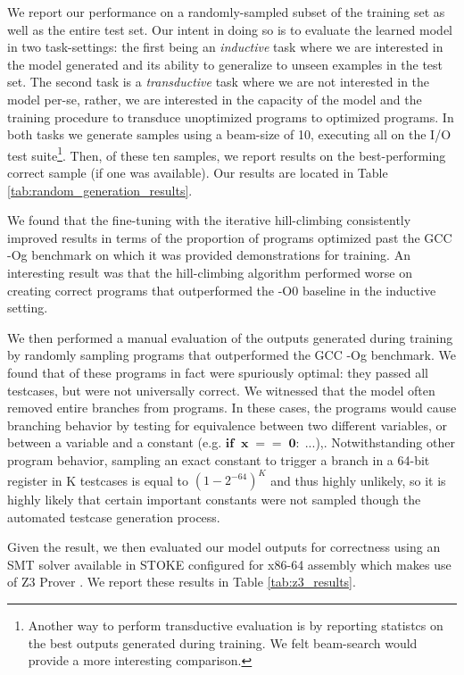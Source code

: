 \documentclass{article}
\begin{document}
We report our performance on a randomly-sampled subset of the training set as well as the entire test set. Our intent in doing so is to evaluate the learned model in two task-settings: the first being an \textit{inductive} task where we are interested in the model generated and its ability to generalize to unseen examples in the test set. The second task is a \textit{transductive} task where we are not interested in the model per-se, rather, we are interested in the capacity of the model and the training procedure to transduce unoptimized programs to optimized programs. In both tasks we generate samples using a beam-size of 10, executing all on the I/O test suite\footnote{Another way to perform transductive evaluation is by reporting statistcs on the best outputs generated during training. We felt beam-search would provide a more interesting comparison.}. Then, of these ten samples, we report results on the best-performing correct sample (if one was available). Our results are located in Table \ref{tab:random_generation_results}. 

We found that the fine-tuning with the iterative hill-climbing consistently improved results in terms of the proportion of programs optimized past the GCC -Og benchmark on which it was provided demonstrations for training. An interesting result was that the hill-climbing algorithm performed worse on creating correct programs that outperformed the -O0 baseline in the inductive setting. 

We then performed a manual evaluation of the outputs generated during training by randomly sampling  programs that outperformed the GCC -Og benchmark. We found that  of these programs in fact were spuriously optimal: they passed all testcases, but were not universally correct. We witnessed that the model often removed entire branches from programs. 
In these cases, the programs would cause branching behavior by testing for equivalence between two different variables, or between a variable and a constant (e.g. $\textbf{if} \;\; \mathbf{x\;==\;0:\; ...}$),. Notwithstanding other program behavior, sampling an exact constant to trigger a branch in a 64-bit register in K testcases is equal to $(1-2^{-64})^K$ and thus highly unlikely, so it is highly likely that certain important constants were not sampled though the automated testcase generation process.

Given the result, we then evaluated our model outputs for correctness using an SMT solver available in \textsc{STOKE} configured for x86-64 assembly which makes use of Z3 Prover \cite{de2008z3}. We report these results in Table \ref{tab:z3_results}. 
\end{document}

